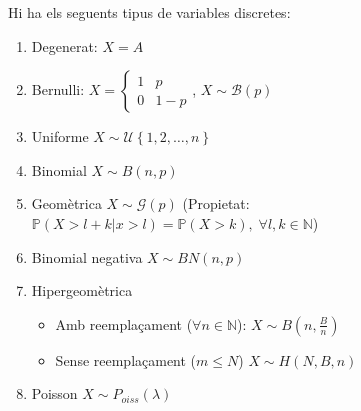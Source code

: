 \documentclass[../main.tex]{subfiles}
\begin{document}
    Hi ha els seguents tipus de variables discretes:
    \begin{enumerate}
        \item Degenerat: $X=A$
        \item Bernulli: $X = \begin{cases}
            1 & p\\
            0 & 1-p
        \end{cases}$, $X \sim \mathcal{B}(p)$
        \item Uniforme $X \sim \mathcal{U}\left\{1, 2, \dots, n\right\}$
        \item Binomial $X \sim B(n, p)$
        \item Geomètrica $X \sim \mathcal{G} \left(p\right)$ (Propietat: $\mathbb{P}\left(X>l+k|x>l\right) = \mathbb{P}\left(X>k\right),\;\forall l,k \in \mathbb{N}$)
        \item Binomial negativa $X \sim BN\left(n, p\right)$
        \item Hipergeomètrica \begin{itemize}
            \item Amb reemplaçament ($\forall n \in \mathbb{N}$): $X \sim B\left(n, \frac{B}{n}\right)$
            \item Sense reemplaçament ($m \leq N$) $X \sim H(N, B, n)$
        \end{itemize}
        \item Poisson $X \sim P_{oiss}(\lambda)$
    \end{enumerate}
\end{document}
